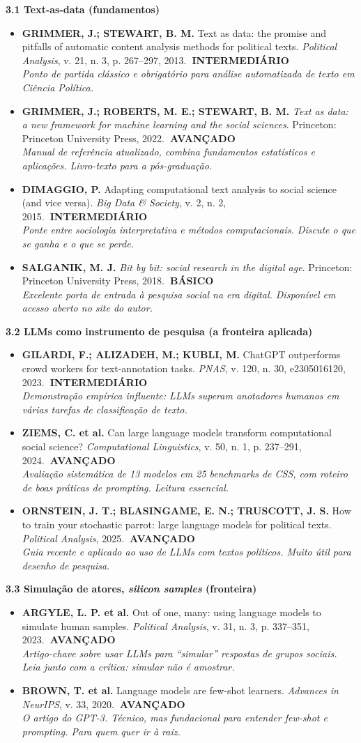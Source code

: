 \documentclass[11pt,a4paper]{article}
\newcommand{\refc}[2]{\item #1\\{\footnotesize\color{cinzaescuro}\textit{#2}}}
\newcommand{\nivelbasico}{\hfill\colorbox{verdeCodigo}{\color{white}\scriptsize\poppinsmed\textbf{~BÁSICO~}}}
\newcommand{\nivelinterm}{\hfill\colorbox{amareloSol}{\color{black}\scriptsize\poppinsmed\textbf{~INTERMEDIÁRIO~}}}
\newcommand{\nivelavancado}{\hfill\colorbox{laranjaDestaque}{\color{white}\scriptsize\poppinsmed\textbf{~AVANÇADO~}}}
\begin{document}
\textbf{\poppinsmed\color{azulUNIclaro}3.1 Text-as-data (fundamentos)}
\begin{itemize}[leftmargin=1.4em]
\refc{\textbf{GRIMMER, J.; STEWART, B. M.} Text as data: the promise and pitfalls of automatic content analysis methods for political texts. \textit{Political Analysis}, v. 21, n. 3, p. 267--297, 2013.\nivelinterm}{Ponto de partida clássico e obrigatório para análise automatizada de texto em Ciência Política.}
\refc{\textbf{GRIMMER, J.; ROBERTS, M. E.; STEWART, B. M.} \textit{Text as data: a new framework for machine learning and the social sciences}. Princeton: Princeton University Press, 2022.\nivelavancado}{Manual de referência atualizado, combina fundamentos estatísticos e aplicações. Livro-texto para a pós-graduação.}
\refc{\textbf{DIMAGGIO, P.} Adapting computational text analysis to social science (and vice versa). \textit{Big Data \& Society}, v. 2, n. 2, 2015.\nivelinterm}{Ponte entre sociologia interpretativa e métodos computacionais. Discute o que se ganha e o que se perde.}
\refc{\textbf{SALGANIK, M. J.} \textit{Bit by bit: social research in the digital age}. Princeton: Princeton University Press, 2018.\nivelbasico}{Excelente porta de entrada à pesquisa social na era digital. Disponível em acesso aberto no site do autor.}
\end{itemize}

\textbf{\poppinsmed\color{azulUNIclaro}3.2 LLMs como instrumento de pesquisa (a fronteira aplicada)}
\begin{itemize}[leftmargin=1.4em]
\refc{\textbf{GILARDI, F.; ALIZADEH, M.; KUBLI, M.} ChatGPT outperforms crowd workers for text-annotation tasks. \textit{PNAS}, v. 120, n. 30, e2305016120, 2023.\nivelinterm}{Demonstração empírica influente: LLMs superam anotadores humanos em várias tarefas de classificação de texto.}
\refc{\textbf{ZIEMS, C. et al.} Can large language models transform computational social science? \textit{Computational Linguistics}, v. 50, n. 1, p. 237--291, 2024.\nivelavancado}{Avaliação sistemática de 13 modelos em 25 \textit{benchmarks} de CSS, com roteiro de boas práticas de prompting. Leitura essencial.}
\refc{\textbf{ORNSTEIN, J. T.; BLASINGAME, E. N.; TRUSCOTT, J. S.} How to train your stochastic parrot: large language models for political texts. \textit{Political Analysis}, 2025.\nivelavancado}{Guia recente e aplicado ao uso de LLMs com textos políticos. Muito útil para desenho de pesquisa.}
\end{itemize}

\textbf{\poppinsmed\color{azulUNIclaro}3.3 Simulação de atores, \textit{silicon samples} (fronteira)}
\begin{itemize}[leftmargin=1.4em]
\refc{\textbf{ARGYLE, L. P. et al.} Out of one, many: using language models to simulate human samples. \textit{Political Analysis}, v. 31, n. 3, p. 337--351, 2023.\nivelavancado}{Artigo-chave sobre usar LLMs para ``simular'' respostas de grupos sociais. Leia junto com a crítica: simular não é amostrar.}
\refc{\textbf{BROWN, T. et al.} Language models are few-shot learners. \textit{Advances in NeurIPS}, v. 33, 2020.\nivelavancado}{O artigo do GPT-3. Técnico, mas fundacional para entender \textit{few-shot} e \textit{prompting}. Para quem quer ir à raiz.}
\end{itemize}
\end{document}
